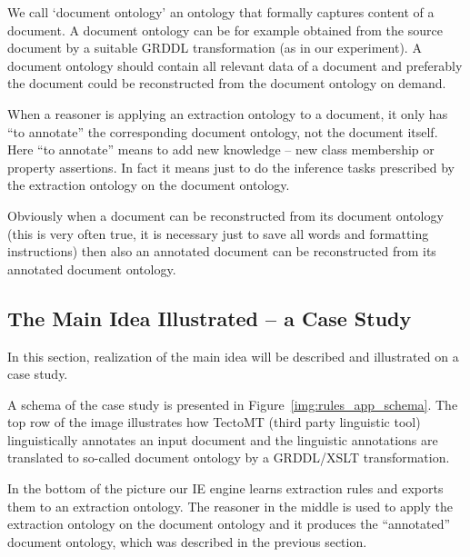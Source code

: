We call `document ontology' an ontology that formally captures content of a document. A document ontology can be for example obtained from the source document by a suitable GRDDL transformation (as in our experiment). A document ontology should contain all relevant data of a document and preferably the document could be reconstructed from the document ontology on demand.

When a reasoner is applying an extraction ontology to a document, it only has ``to annotate'' the corresponding document ontology, not the document itself. Here ``to annotate'' means to add new knowledge -- new class membership or property assertions. In fact it means just to do the inference tasks prescribed by the extraction ontology on the document ontology. 

Obviously when a document can be reconstructed from its document ontology (this is very often true, it is necessary just to save all words and formatting instructions) then also an annotated document can be reconstructed from its annotated document ontology. 





\subsection{The Main Idea Illustrated -- a Case Study} \label{sec:case}

In this section, realization of the main idea will be described and illustrated on a case study.

A schema of the case study is presented in Figure~\ref{img:rules_app_schema}.  
The top row of the image illustrates how TectoMT (third party linguistic tool) linguistically annotates an input document and the linguistic annotations are translated to so-called document ontology by a GRDDL/XSLT transformation.

In the bottom of the picture our IE engine learns extraction rules and exports them to an extraction ontology. The reasoner in the middle is used to apply the extraction ontology on the document ontology and it produces the ``annotated'' document ontology, which was described in the previous section.



